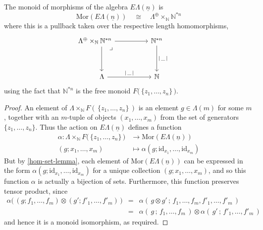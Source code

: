 \documentclass{amsbook} %
\newcommand{\id}{\textrm{id}}
\newcommand{\lop}{\Lambda^{\oplus}}
\newcommand{\ELn}{E\Lambda(\underline{n})}
\numberwithin{section}{chapter}
\begin{document}
\begin{lem} \label{Gnmor} The monoid of morphisms of the algebra $\ELn$ is
\[ \mathrm{Mor}(\ELn) \quad \cong \quad \lop \times_{\mathbb{N}} \mathbb{N}^{\ast n} \]
where this is a pullback taken over the respective length homomorphisms,
\[ \begin{tikzcd}
\lop \times_{\mathbb{N}} \mathbb{N}^{\ast n} \ar[dd, shift left=4] \ar[rr] \ar[ddrr, phantom, "\lrcorner", very near start, shift left] & & \mathbb{N}^{\ast n} \ar[dd, "| \, \_ \, |"] & \\
& & & \\
\quad \quad \Lambda \ar[rr, "| \, \_ \, |"] & & \mathbb{N} &
\end{tikzcd} \]
using the fact that $\mathbb{N}^{\ast n}$ is the free monoid $F\big( \, \{z_1, \ldots, z_n\} \, \big)$.
\end{lem}
\begin{proof}
An element of $\Lambda \times_{\mathbb{N}} F( \, \{z_1, \ldots, z_n\} \, )$ is an element $g \in \Lambda(m)$ for some $m$, together with an $m$-tuple of objects $(x_1, \ldots, x_m)$ from the set of generators $\{z_1, \ldots, z_n\}$. Thus the action on $\ELn$ defines a function 
\begin{align*}
    \alpha \colon \Lambda \times_{\mathbb{N}} F\big( \, \{z_1, \ldots, z_n\} \, \big) &\to \mathrm{Mor}(\ELn) \\
    (g;x_1, \ldots, x_m) &\mapsto \alpha(g; \id_{x_1}, \ldots, \id_{x_m})
\end{align*}
But by \cref{hom-set-lemma}, each element of $\mathrm{Mor}(\ELn)$ can be expressed in the form $\alpha(g; \id_{x_1}, \ldots, \id_{x_m})$ for a unique collection $(g;x_1, \ldots, x_m)$, and so this function $\alpha$ is actually a bijection of sets. Furthermore, this function preserves tensor product, since
\[ \begin{array}{rll}
			\alpha\big( \, (g;f_1, \ldots, f_m) \otimes (g';f'_1, \ldots, f'_m) \, \big) & = & \alpha( \, g \otimes g' \, ; \, f_1, \ldots, f_m, f'_1, \ldots, f'_m \, ) \\
			& = & \alpha( \, g \, ; \, f_1, \ldots, f_m \, ) \otimes \alpha( \, g' \, ; \, f'_1, \ldots, f'_m \, )
		\end{array}
\]
and hence it is a monoid isomorphism, as required.
\end{proof}
\end{document}
